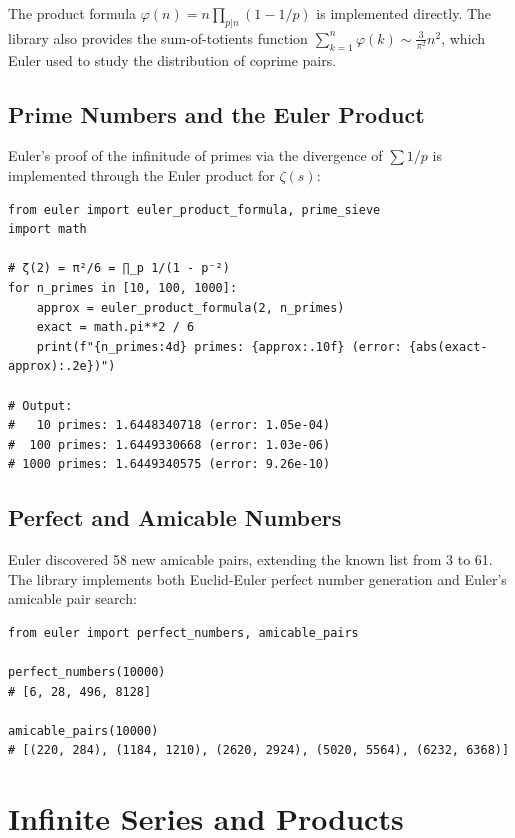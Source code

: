 \documentclass[11pt,a4paper]{article}
\theoremstyle{definition}
\begin{document}
The product formula $\varphi(n) = n \prod_{p|n} (1 - 1/p)$ is implemented directly. The library also provides the sum-of-totients function $\sum_{k=1}^n \varphi(k) \sim \frac{3}{\pi^2}n^2$, which Euler used to study the distribution of coprime pairs.

\subsection{Prime Numbers and the Euler Product}
Euler's proof of the infinitude of primes via the divergence of $\sum 1/p$ \cite{euler1737} is implemented through the Euler product for $\zeta(s)$:

\begin{lstlisting}[caption={Euler product for zeta}, label=lst:euler_product]
from euler import euler_product_formula, prime_sieve
import math

# ζ(2) = π²/6 = ∏_p 1/(1 - p⁻²)
for n_primes in [10, 100, 1000]:
    approx = euler_product_formula(2, n_primes)
    exact = math.pi**2 / 6
    print(f"{n_primes:4d} primes: {approx:.10f} (error: {abs(exact-approx):.2e})")

# Output:
#   10 primes: 1.6448340718 (error: 1.05e-04)
#  100 primes: 1.6449330668 (error: 1.03e-06)
# 1000 primes: 1.6449340575 (error: 9.26e-10)
\end{lstlisting}

\subsection{Perfect and Amicable Numbers}
Euler discovered 58 new amicable pairs, extending the known list from 3 to 61. The library implements both Euclid-Euler perfect number generation and Euler's amicable pair search:

\begin{lstlisting}[caption={Perfect and amicable numbers}, label=lst:perfect_amicable]
from euler import perfect_numbers, amicable_pairs

perfect_numbers(10000)
# [6, 28, 496, 8128]

amicable_pairs(10000)
# [(220, 284), (1184, 1210), (2620, 2924), (5020, 5564), (6232, 6368)]
\end{lstlisting}

\section{Infinite Series and Products}
\label{sec:analysis}
\end{document}
